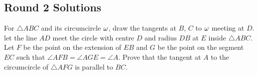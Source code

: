 \subsection{Round 2 Solutions}\label{S::2022-O-2}

\begin{resources}
\end{resources}

\begin{question}\label{Q::2022-O-2-1}
    For $\triangle ABC$ and its circumcircle $\omega$, draw the tangents at $B$, $C$ to $\omega$ meeting at $D$. let the line $AD$ meet the circle with centre $D$ and radius $DB$ at $E$ inside $\triangle ABC$. Let $F$ be the point on the extension of $EB$ and $G$ be the point on the segment $EC$ such that $\angle AFB = \angle AGE = \angle A$. Prove that the tangent at $A$ to the circumcircle of $\triangle AFG$ is parallel to $BC$.
\end{question}
